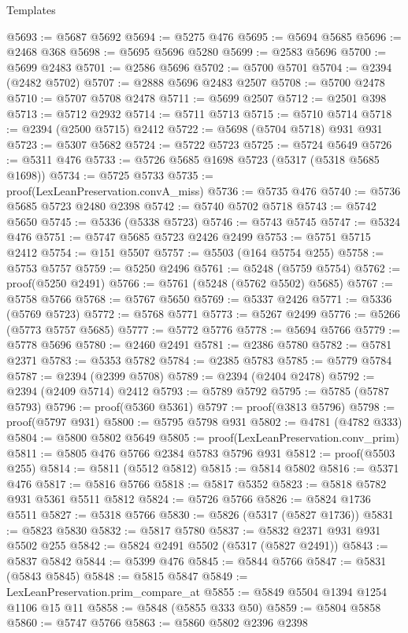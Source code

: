 \begin{lexlean}{Templates}
\begin{coremodule}
@5693 := @5687 @5692
@5694 := @5275 @476
@5695 := @5694 @5685
@5696 := @2468 @368
@5698 := @5695 @5696 @5280
@5699 := @2583 @5696
@5700 := @5699 @2483
@5701 := @2586 @5696
@5702 := @5700 @5701
@5704 := @2394 (@2482 @5702)
@5707 := @2888 @5696 @2483 @2507
@5708 := @5700 @2478
@5710 := @5707 @5708 @2478
@5711 := @5699 @2507
@5712 := @2501 @398
@5713 := @5712 @2932
@5714 := @5711 @5713
@5715 := @5710 @5714
@5718 := @2394 (@2500 @5715) @2412
@5722 := @5698 (@5704 @5718) @931 @931
@5723 := @5307 @5682
@5724 := @5722 @5723
@5725 := @5724 @5649
@5726 := @5311 @476
@5733 := @5726 @5685 @1698 @5723 (@5317 (@5318 @5685 @1698))
@5734 := @5725 @5733
@5735 := proof(LexLeanPreservation.convA_miss)
@5736 := @5735 @476
@5740 := @5736 @5685 @5723 @2480 @2398
@5742 := @5740 @5702 @5718
@5743 := @5742 @5650
@5745 := @5336 (@5338 @5723)
@5746 := @5743 @5745
@5747 := @5324 @476
@5751 := @5747 @5685 @5723 @2426 @2499
@5753 := @5751 @5715 @2412
@5754 := @151 @5507
@5757 := @5503 (@164 @5754 @255)
@5758 := @5753 @5757
@5759 := @5250 @2496
@5761 := @5248 (@5759 @5754)
@5762 := proof(@5250 @2491)
@5766 := @5761 (@5248 (@5762 @5502) @5685)
@5767 := @5758 @5766
@5768 := @5767 @5650
@5769 := @5337 @2426
@5771 := @5336 (@5769 @5723)
@5772 := @5768 @5771
@5773 := @5267 @2499
@5776 := @5266 (@5773 @5757 @5685)
@5777 := @5772 @5776
@5778 := @5694 @5766
@5779 := @5778 @5696
@5780 := @2460 @2491
@5781 := @2386 @5780
@5782 := @5781 @2371
@5783 := @5353 @5782
@5784 := @2385 @5783
@5785 := @5779 @5784
@5787 := @2394 (@2399 @5708)
@5789 := @2394 (@2404 @2478)
@5792 := @2394 (@2409 @5714) @2412
@5793 := @5789 @5792
@5795 := @5785 (@5787 @5793)
@5796 := proof(@5360 @5361)
@5797 := proof(@3813 @5796)
@5798 := proof(@5797 @931)
@5800 := @5795 @5798 @931
@5802 := @4781 (@4782 @333)
@5804 := @5800 @5802 @5649
@5805 := proof(LexLeanPreservation.conv_prim)
@5811 := @5805 @476 @5766 @2384 @5783 @5796 @931
@5812 := proof(@5503 @255)
@5814 := @5811 (@5512 @5812)
@5815 := @5814 @5802
@5816 := @5371 @476
@5817 := @5816 @5766
@5818 := @5817 @5352
@5823 := @5818 @5782 @931 @5361 @5511 @5812
@5824 := @5726 @5766
@5826 := @5824 @1736 @5511
@5827 := @5318 @5766
@5830 := @5826 (@5317 (@5827 @1736))
@5831 := @5823 @5830
@5832 := @5817 @5780
@5837 := @5832 @2371 @931 @931 @5502 @255
@5842 := @5824 @2491 @5502 (@5317 (@5827 @2491))
@5843 := @5837 @5842
@5844 := @5399 @476
@5845 := @5844 @5766
@5847 := @5831 (@5843 @5845)
@5848 := @5815 @5847
@5849 := LexLeanPreservation.prim_compare_at
@5855 := @5849 @5504 @1394 @1254 @1106 @15 @11
@5858 := @5848 (@5855 @333 @50)
@5859 := @5804 @5858
@5860 := @5747 @5766
@5863 := @5860 @5802 @2396 @2398

\end{coremodule}
\end{lexlean}
